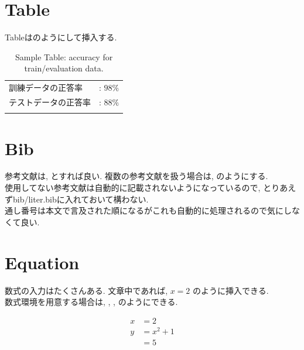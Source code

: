 \section{Table}
Tableはのようにして挿入する.
\begin{table}[H]
	\centering
	\caption{Sample Table: accuracy for train/evaluation data.}
	\begin{tabular}{ll}\hline
		 訓練データの正答率&: $98\%$ \\
		 テストデータの正答率&: $88\%$ \\
	\label{tb:sample_table}
	\end{tabular}
\end{table}

\section{Bib}
参考文献は, \cite{author:06}とすれば良い.
複数の参考文献を扱う場合は, \cite{author:06, conference:06}のようにする.\\
使用してない参考文献は自動的に記載されないようになっているので, とりあえずbib/liter.bibに入れておいて構わない.\\
通し番号は本文で言及された順になるがこれも自動的に処理されるので気にしなくて良い.

\section{Equation}
数式の入力はたくさんある.
文章中であれば, $x = 2$ のように挿入できる.\\
数式環境を用意する場合は, , , のようにできる.

\begin{align}
    x &= 2 \label{eq:sample1}\\
    y &= x^2 + 1 \label{eq:sample2}\\
      &= 5 \label{eq:sample3}
\end{align}

